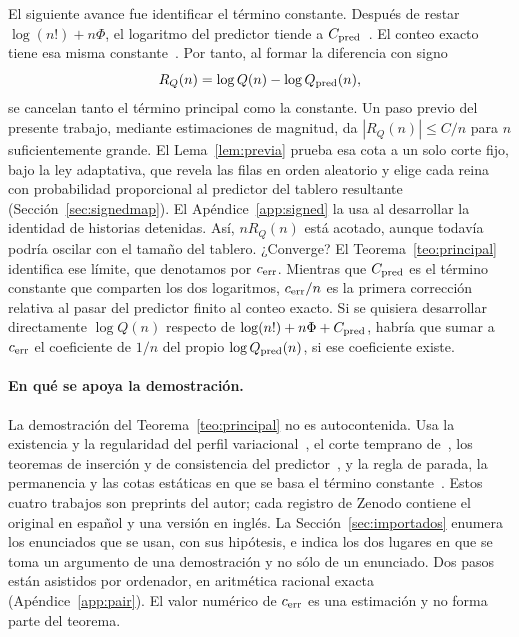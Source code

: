El siguiente avance fue identificar el término constante. Después de restar $\log(n!)+n\Phi$,
el logaritmo del predictor tiende a $C_{\rm pred}$~\cite{pc}. El conteo exacto tiene esa misma
constante~\cite{tc}. Por tanto, al formar la diferencia con signo
\[
 R_Q(n)=\log Q(n)-\log Q_{\rm pred}(n),
\]
se cancelan tanto el término principal como la constante. Un paso previo del presente trabajo,
mediante estimaciones de magnitud, da $|R_Q(n)|\le C/n$ para $n$ suficientemente grande.
El Lema~\ref{lem:previa} prueba esa cota a un solo corte fijo, bajo la ley adaptativa, que revela las
filas en orden aleatorio y elige cada reina con probabilidad proporcional al predictor del tablero
resultante (Sección~\ref{sec:signedmap}).
El Apéndice~\ref{app:signed} la usa al desarrollar la identidad de historias detenidas.
Así, $nR_Q(n)$ está acotado, aunque todavía podría oscilar con el tamaño del tablero. ¿Converge?
El Teorema~\ref{teo:principal} identifica ese límite, que denotamos por \(c_{\mathrm{err}}\). Mientras que
\(C_{\rm pred}\) es el término constante que comparten los dos logaritmos, \(c_{\mathrm{err}}/n\) es la primera
corrección relativa al pasar del predictor finito al conteo exacto. Si se quisiera desarrollar
directamente \(\log Q(n)\) respecto de \(\log(n!)+n\Phi+C_{\rm pred}\), habría que sumar a
\(c_{\mathrm{err}}\) el coeficiente de \(1/n\) del propio \(\log Q_{\rm pred}(n)\), si ese coeficiente existe.

\paragraph{En qué se apoya la demostración.} La demostración del Teorema~\ref{teo:principal} no es
autocontenida. Usa la existencia y la regularidad del perfil variacional~\cite{pv}, el corte temprano
de~\cite{ef}, los teoremas de inserción y de consistencia del predictor~\cite{pc}, y la regla de parada,
la permanencia y las cotas estáticas en que se basa el término constante~\cite{tc}. Estos cuatro
trabajos son preprints del autor; cada registro de Zenodo contiene el original en español y una versión
en inglés. La Sección~\ref{sec:importados} enumera los enunciados que se usan, con sus hipótesis, e
indica los dos lugares en que se toma un argumento de una demostración y no sólo de un enunciado. Dos
pasos están asistidos por ordenador, en aritmética racional exacta (Apéndice~\ref{app:pair}). El valor
numérico de \(c_{\mathrm{err}}\) es una estimación y no forma parte del teorema.

